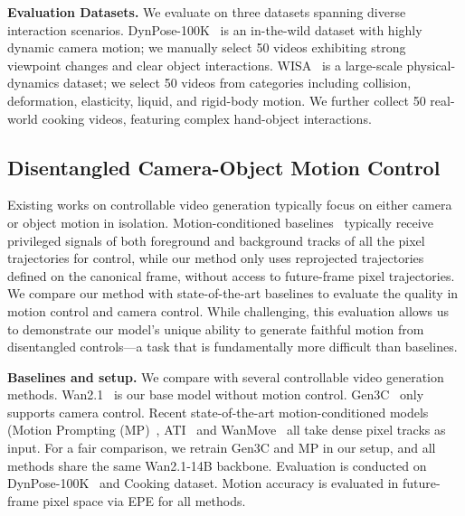 \noindent\textbf{Evaluation Datasets.}
We evaluate on three datasets spanning diverse interaction scenarios.
DynPose-100K~\cite{rockwell2025dynamic} is an in-the-wild dataset with highly dynamic camera motion; we manually select 50 videos exhibiting strong viewpoint changes and clear object interactions.
WISA~\cite{wang2025wisa} is a large-scale physical-dynamics dataset; we select 50 videos from categories including collision, deformation, elasticity, liquid, and rigid-body motion.
We further collect 50 real-world cooking videos, featuring complex hand-object interactions.











\subsection{Disentangled Camera-Object Motion Control}
\label{sec:ctrl_generation}

Existing works on controllable video generation typically focus on either camera or object motion in isolation. Motion-conditioned baselines~\cite{geng2024motionprompting,wang2025ati,chu2025wanmove} typically receive privileged signals of both foreground and background tracks of all the pixel trajectories for control, while our method only uses reprojected trajectories defined on the canonical frame, without access to future-frame pixel trajectories. We compare our method with state-of-the-art baselines to evaluate the quality in motion control and camera control. While challenging, this evaluation allows us to demonstrate our model's unique ability to generate faithful motion from disentangled controls—a task that is fundamentally more difficult than baselines.

\noindent\textbf{Baselines and setup.}
We compare with several controllable video generation methods.
Wan2.1~\cite{wan2025wan} is our base model without motion control.
Gen3C~\cite{ren2025gen3c} only supports camera control. Recent state-of-the-art motion-conditioned models (Motion Prompting (MP)~\cite{geng2024motionprompting}, ATI~\cite{wang2025ati} and
WanMove~\cite{chu2025wanmove} all take dense pixel tracks as input.
For a fair comparison, we retrain Gen3C and MP in our setup, and all methods share the same Wan2.1-14B backbone. Evaluation is conducted on DynPose-100K~\cite{rockwell2025dynamic} and Cooking dataset. Motion accuracy is evaluated in future-frame pixel space via EPE for all methods.

